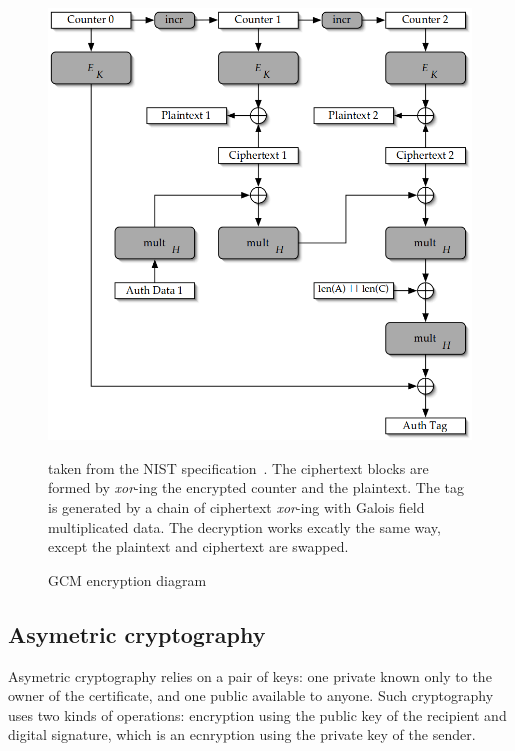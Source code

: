 \begin{figure}
\includegraphics[width=\textwidth]{nist-gcm-encrypt}
\caption{GCM encryption diagram}{taken from the NIST specification~\cite{mcgrew2005}. The ciphertext blocks are formed by \textit{xor}-ing the encrypted counter and the plaintext. The tag is generated by a chain of ciphertext \textit{xor}-ing with Galois field multiplicated data. The decryption works excatly the same way, except the plaintext and ciphertext are swapped.}
\label{fig:gcm-encrypt}
\end{figure}




\subsection{Asymetric cryptography}
Asymetric cryptography relies on a pair of keys: one private known only to the owner of the certificate, and one public available to anyone.
Such cryptography uses two kinds of operations: encryption using the public key of the recipient and digital signature, which is an ecnryption using the private key of the sender.

